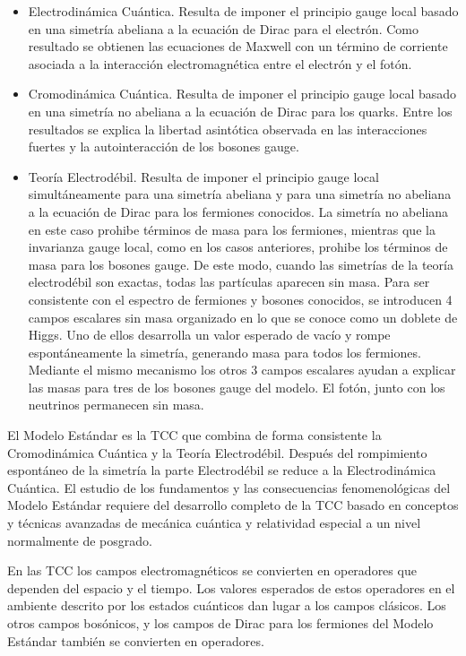 \begin{itemize}
\item Electrodinámica Cuántica. Resulta de imponer el principio gauge local basado en una simetría abeliana a la ecuación de Dirac para el electrón. Como resultado se obtienen las ecuaciones de Maxwell con un término de corriente asociada a la interacción electromagnética entre el electrón y el fotón.
\item Cromodinámica Cuántica. Resulta de imponer el principio gauge local basado en una simetría no abeliana a la ecuación de Dirac para los quarks. Entre los resultados se explica la libertad asintótica observada en las interacciones fuertes y la autointeracción de los bosones gauge.
\item Teoría Electrodébil. Resulta de imponer el principio gauge local simultáneamente para una simetría abeliana y para una simetría no abeliana a la ecuación de Dirac para los fermiones conocidos. La simetría no abeliana en este caso prohibe términos de masa para los fermiones, mientras que la invarianza gauge local, como en los casos anteriores, prohibe los términos de masa para los bosones gauge. De este modo, cuando las simetrías de la teoría electrodébil son exactas, todas las partículas aparecen sin masa. Para ser consistente con el espectro de fermiones y bosones conocidos, se introducen 4 campos escalares sin masa organizado en lo que se conoce como un doblete de Higgs. Uno de ellos desarrolla un valor esperado de vacío y rompe espontáneamente la simetría, generando masa para todos los fermiones. Mediante el mismo mecanismo los otros 3 campos escalares ayudan a explicar las masas para tres de los bosones gauge del modelo. El fotón, junto con los neutrinos permanecen sin masa. 
\end{itemize} %

El Modelo Estándar es la TCC que combina de forma consistente la Cromodinámica Cuántica y la Teoría Electrodébil. Después del rompimiento espontáneo de la simetría la parte Electrodébil se reduce a la Electrodinámica Cuántica. El estudio de los fundamentos y las consecuencias fenomenológicas del Modelo Estándar requiere del desarrollo completo de la TCC basado en conceptos y técnicas avanzadas de mecánica cuántica y relatividad especial a un nivel normalmente de posgrado. 

En las TCC los campos electromagnéticos se convierten en operadores que dependen del espacio y el tiempo. Los valores esperados de estos operadores en el ambiente descrito por los estados cuánticos dan lugar a los campos clásicos. Los otros campos bosónicos, y los campos de Dirac para los fermiones del Modelo Estándar también se convierten en operadores. 

